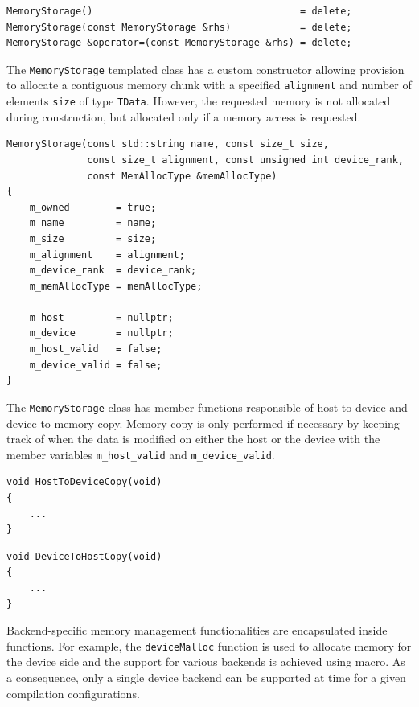 \begin{lstlisting}[style=C++Style]
MemoryStorage()                                    = delete;
MemoryStorage(const MemoryStorage &rhs)            = delete;
MemoryStorage &operator=(const MemoryStorage &rhs) = delete;
\end{lstlisting}

The \lstinline[style=C++Style]!MemoryStorage! templated class has a custom constructor allowing provision to allocate a contiguous memory chunk with a specified \lstinline[style=C++Style]!alignment! and number of elements \lstinline[style=C++Style]!size! of type \lstinline[style=C++Style]!TData!. However, the requested memory is not allocated during construction, but allocated only if a memory access is requested.

\begin{lstlisting}[style=C++Style]
MemoryStorage(const std::string name, const size_t size,
              const size_t alignment, const unsigned int device_rank,
              const MemAllocType &memAllocType)
{
    m_owned        = true;
    m_name         = name;
    m_size         = size;
    m_alignment    = alignment;
    m_device_rank  = device_rank;
    m_memAllocType = memAllocType;

    m_host         = nullptr;
    m_device       = nullptr;
    m_host_valid   = false;
    m_device_valid = false;
}
\end{lstlisting}

The \lstinline[style=C++Style]!MemoryStorage! class has member functions responsible of host-to-device and device-to-memory copy. Memory copy is only performed if necessary by keeping track of when the data is modified on either the host or the device with the member variables \lstinline[style=C++Style]!m_host_valid! and \lstinline[style=C++Style]!m_device_valid!.

\begin{lstlisting}[style=C++Style]
void HostToDeviceCopy(void)
{     
    ...
}
\end{lstlisting}

\begin{lstlisting}[style=C++Style]
void DeviceToHostCopy(void)
{  
    ...
}
\end{lstlisting}

Backend-specific memory management functionalities are encapsulated inside functions. For example, the \lstinline[style=C++Style]!deviceMalloc! function is used to allocate memory for the device side and the support for various backends is achieved using macro. As a consequence, only a single device backend can be supported at time for a given compilation configurations.

